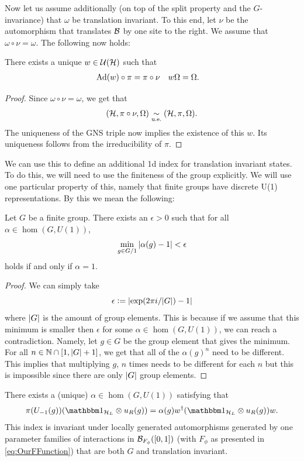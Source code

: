 \documentclass[12pt,a4paper,twoside]{article}
\numberwithin{equation}{section}
\begin{document}
Now let us assume additionally (on top of the split property and the $G$-invariance) that $\omega$ be translation invariant. To this end, let $\nu$ be the automorphism that translates $\mathcal B$ by one site to the right. We assume that $\omega\circ\nu=\omega$. The following now holds:
\begin{lemma}
	There exists a unique $w\in\mathcal U(\mathcal H)$ such that
	\begin{align}
		\Ad{w}\circ\pi&=\pi\circ\nu&w\Omega&=\Omega.
	\end{align}
\end{lemma}
\begin{proof}
	Since $\omega\circ\nu=\omega$, we get that
	\begin{equation}
		(\mathcal H,\pi\circ\nu,\Omega)\underset{\text{u.e.}}{\sim} (\mathcal H,\pi,\Omega).
	\end{equation}
	The uniqueness of the GNS triple now implies the existence of this $w$. Its uniqueness follows from the irreducibility of $\pi$.
\end{proof}
We can use this to define an additional 1d index for translation invariant states. To do this, we will need to use the finiteness of the group explicitly. We will use one particular property of this, namely that finite groups have discrete U(1) representations. By this we mean the following:
\begin{lemma}\label{lem:FiniteGroupsHaveDiscreteU(1)Representations}
	Let $G$ be a finite group. There exists an $\epsilon>0$ such that for all $\alpha\in\hom(G,U(1))$,
	\begin{equation}
		\min_{g\in G/1}\abs{\alpha(g)-1}<\epsilon
	\end{equation}
	holds if and only if $\alpha=1$.
\end{lemma}
\begin{proof}
	We can simply take
	\begin{equation}
		\epsilon\vcentcolon= \abs{\exp(2\pi i/\abs{G})-1}
	\end{equation}
	where $\abs{G}$ is the amount of group elements. This is because if we assume that this minimum is smaller then $\epsilon$ for some $\alpha\in\hom(G,U(1))$, we can reach a contradiction. Namely, let $g\in G$ be the group element that gives the minimum. For all $n\in\mathbb{N}\cap [1,\abs{G}+1]$, we get that all of the $\alpha(g)^n$ need to be different. This implies that multiplying $g$, $n$ times needs to be different for each $n$ but this is impossible since there are only $\abs{G}$ group elements.
\end{proof}
\begin{lemma}
	There exists a (unique) $\alpha\in\hom(G,U(1))$ satisfying that
	\begin{equation}
		\pi(U_{-1}(g)) (\id_{\HH_L}\otimes u_R(g))=\alpha(g)w^\dagger(\id_{\HH_L}\otimes u_R(g)) w.
	\end{equation}
	This index is invariant under locally generated automorphisms generated by one parameter families of interactions in $\mathcal B_{F_\phi}([0,1])$ (with $F_\phi$ as presented in \eqref{eq:OurFFunction}) that are both $G$ and translation invariant.
\end{lemma}
\end{document}
